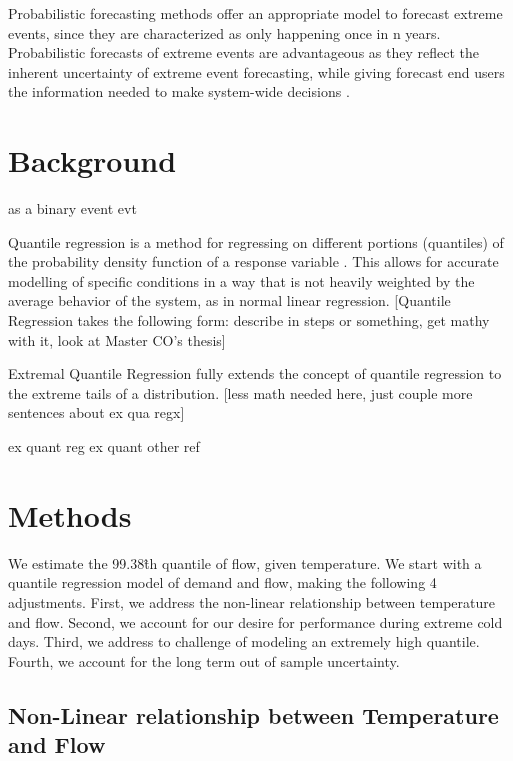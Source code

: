 \documentclass{article}
\begin{document}
Probabilistic forecasting methods offer an appropriate model to forecast extreme events, since they are characterized as only happening once in n years. Probabilistic forecasts of extreme events are advantageous as they reflect the inherent uncertainty of extreme event forecasting, while giving forecast end users the information needed to make system-wide decisions \cite{murphy1991probabilities}.


\section{Background}
as a binary event\cite{toth2003probability}
evt\cite{kotz2000extreme}


Quantile regression is a method for regressing on different portions (quantiles) of the probability density function of a response variable \cite{koenker1978regression}. This allows for accurate modelling of specific conditions in a way that is not heavily weighted by the average behavior of the system, as in normal linear regression. [Quantile Regression takes the following form: describe in steps or something, get mathy with it, look at Master CO's thesis]


Extremal Quantile Regression fully extends the concept of quantile regression to the extreme tails of a distribution. [less math needed here, just couple more sentences about ex qua regx]

ex quant reg \cite{chernozhukov2005extremal}
ex quant other ref \cite{wang2012estimation}

\section{Methods}

We estimate the 99.38\^{th} quantile of flow, given temperature. We start with a quantile regression model of demand and flow, making the following 4 adjustments. First, we address the non-linear relationship between temperature and flow. Second, we account for our desire for performance during extreme cold days. Third, we address to challenge of modeling an extremely high quantile. Fourth, we account for the long term out of sample uncertainty.

\subsection{Non-Linear relationship between Temperature and Flow}
\end{document}
